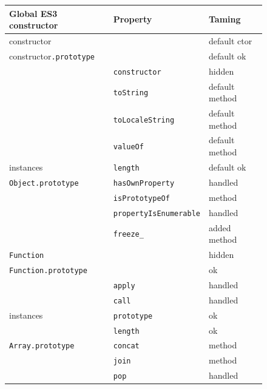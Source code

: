 \documentclass[letterpaper,twocolumn,10pt]{article}
\newcommand{\code}[1]{{\tt {#1}}}              %
\begin{document}
\begin{figure}
\begin{tabular}{lll}
  Global ES3 constructor         & Property                    & Taming \\
  \hline 
  constructor                    &                             & default ctor \\
  constructor\code{.prototype}   &                             & default ok \\
                                 & \code{constructor}          & hidden \\
                                 & \code{toString}             & default method \\
                                 & \code{toLocaleString}       & default method \\
                                 & \code{valueOf}              & default method \\
  instances                      & \code{length}               & default ok \\
  \hline
  \code{Object.prototype}        & \code{hasOwnProperty}       & handled \\
                                 & \code{isPrototypeOf}        & method \\
                                 & \code{propertyIsEnumerable} & handled \\
                                 & \code{freeze\_}             & added method \\
  \hline
  \code{Function}                &                             & hidden \\
  \code{Function.prototype}      &                             & ok \\
                                 & \code{apply}                & handled \\
                                 & \code{call}                 & handled \\
  instances                      & \code{prototype}            & ok \\
                                 & \code{length}               & ok \\
  \hline
  \code{Array.prototype}         & \code{concat}               & method \\
                                 & \code{join}                 & method \\
                                 & \code{pop}                  & handled \\

\end{tabular}
\end{figure}
\end{document}
